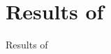 \documentclass[a4paper,11pt]{article}
\DeclareMathOperator{\pw}{pw}
\theoremstyle{plain}
\theoremstyle{definition}
\begin{document}
%
%
%

%
%


\section{Results of \citet{BDDEW}}

Results of \citet{BDDEW}



%

\end{document}
